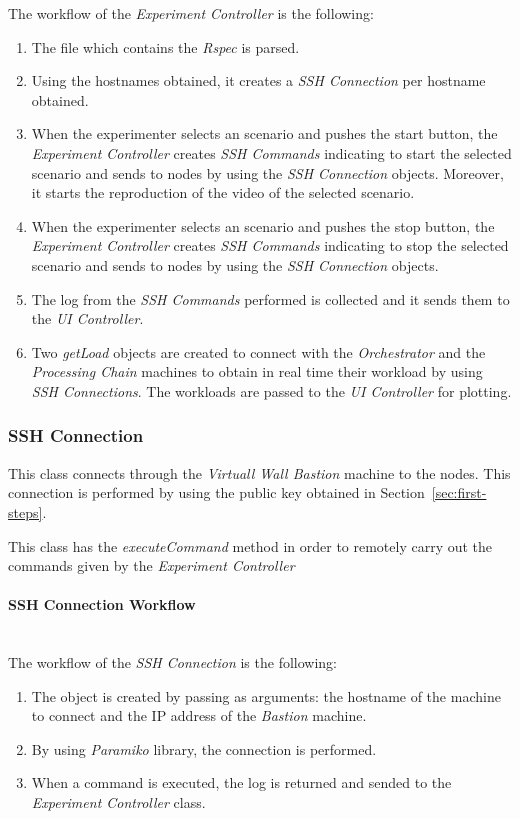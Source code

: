 The workflow of the \emph{Experiment Controller} is the following:
\begin{enumerate}
\item The file which contains the \emph{Rspec} is parsed.
\item Using the hostnames obtained, it creates a \emph{SSH Connection} per hostname obtained.
\item When the experimenter selects an scenario and pushes the start button, the \emph{Experiment Controller} creates \emph{SSH Commands} indicating to start the selected scenario and sends to \vw nodes by using the \emph{SSH Connection} objects. Moreover, it starts the reproduction of the video of the selected scenario.
\item When the experimenter selects an scenario and pushes the stop button, the \emph{Experiment Controller} creates \emph{SSH Commands} indicating to stop the selected scenario and sends to \vw nodes by using the \emph{SSH Connection} objects.
\item The log from the \emph{SSH Commands} performed is collected and it sends them to the \emph{UI Controller}.
\item Two \emph{getLoad} objects are created to connect with the \emph{Orchestrator} and the \emph{Processing Chain} machines to obtain in real time their workload by using \emph{SSH Connections}. The workloads are passed to the \emph{UI Controller} for plotting.
\end{enumerate}

\subsubsection{SSH Connection}

This class connects through the \emph{Virtuall Wall Bastion} machine to the \vw nodes. This connection is performed by using the public key obtained in Section~\ref{sec:first-steps}.

This class has the \emph{executeCommand} method in order to remotely carry out the commands given by the \emph{Experiment Controller}

\paragraph{SSH Connection Workflow}~\\

The workflow of the \emph{SSH Connection} is the following:
\begin{enumerate}
\item The object is created by passing as arguments: the hostname of the \vw machine to connect and the \ac{IP} address of the \vw \emph{Bastion} machine.
\item By using \emph{Paramiko} library, the connection is performed.
\item When a command is executed, the log is returned and sended to the \emph{Experiment Controller} class.
\end{enumerate}


